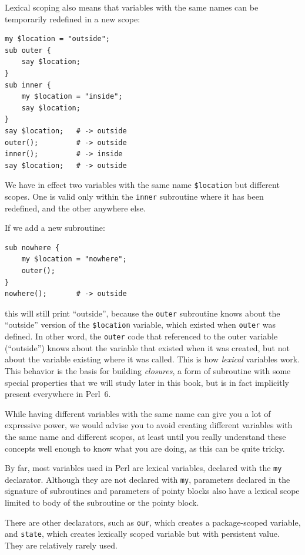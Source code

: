 Lexical scoping also means that variables with the same names
can be temporarily redefined in a new scope: 

\begin{verbatim}
my $location = "outside";
sub outer {
    say $location;
}
sub inner {
    my $location = "inside";
    say $location;
}
say $location;   # -> outside
outer();         # -> outside
inner();         # -> inside
say $location;   # -> outside
\end{verbatim}
% 
We have in effect two variables with the same name 
{\tt \$location} but different scopes. One is valid only 
within the {\tt inner} subroutine where it has been redefined, 
and the other anywhere else.

If we add a new subroutine:
\begin{verbatim}
sub nowhere {
    my $location = "nowhere";
    outer();
}
nowhere();       # -> outside
\end{verbatim}
% 
this will still print ``outside'', because the {\tt outer} 
subroutine knows about the ``outside'' version of the 
{\tt \$location} variable, which existed when {\tt outer} was defined.
In other word, the {\tt outer} code that referenced to the 
outer variable (``outside'') knows about the variable that existed 
when it was created, but not about the variable existing where 
it was called. This is how \emph{lexical} variables work. 
This behavior is the basis for building \emph{closures}, a  
form of subroutine with some special properties that we 
will study later in this book, but 
is in fact implicitly present everywhere in Perl~6.

While having different variables with the same name can give 
you a lot of expressive power, we would 
advise you to avoid creating different variables with the 
same name and different scopes, at least until you really understand 
these concepts well enough to know what you are doing, as this 
can be quite tricky.

By far, most variables used in Perl are lexical variables, 
declared with the {\tt my} declarator. Although they are 
not declared with {\tt my}, parameters declared 
in the signature of subroutines and parameters of pointy 
blocks also have a lexical scope limited to body of the 
subroutine or the pointy block.

There are other declarators, such as {\tt our}, which creates 
a package-scoped variable, and {\tt state}, which creates 
lexically scoped variable but with persistent value. They 
are relatively rarely used.

